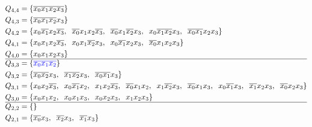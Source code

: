 \documentclass[a4paper]{article}
\begin{document}
\begin{enumerate}[label=\alph*)]
\begin{enumerate}[label=\roman*)]
		\begin{align*}
			Q_{4,4} &= \{\overline{x_0 x_1 x_2 x_3}\}\\
			Q_{4,3} &= \{\overline{x_0 x_1 x_2} x_3\}\\
			Q_{4,2} &= \{x_0 \overline{x_1} x_2 \overline{x_3},\hspace{0.2cm} \overline{x_0} x_1 x_2 \overline{x_3},\hspace{0.2cm} \overline{x_0} x_1 \overline{x_2} x_3,\hspace{0.2cm} 
			x_0 \overline{x_1 x_2} x_3,\hspace{0.2cm} 
			\overline{x_0 x_1} x_2 x_3
			\}\\
			Q_{4,1} &= \{x_0 x_1 x_2 \overline{x_3},\hspace{0.2cm} x_0 x_1 \overline{x_2} x_3,\hspace{0.2cm} 
			x_0 \overline{x_1} x_2 x_3,\hspace{0.2cm} \overline{x_0} x_1 x_2 x_3
				\}\\
			Q_{4,0} &= \{x_0 x_1 x_2 x_3\}\\
			\hline
			Q_{3,3} &= \{\textcolor{blue}{\overline{x_0x_1x_2}}\}\\
			Q_{3,2} &= \{\overline{x_0x_2}x_3,\hspace{0.2cm} \overline{x_1x_2}x_3,\hspace{0.2cm}
			\overline{x_0x_1}x_3\}\\
			Q_{3,1} &= \{x_0x_2\overline{x_3},\hspace{0.2cm} x_0\overline{x_1}x_2,\hspace{0.2cm} 
			x_1x_2\overline{x_3},\hspace{0.2cm} 
			\overline{x_0}x_1x_2,\hspace{0.2cm} 
			x_1\overline{x_2}x_3,\hspace{0.2cm} 
			\overline{x_0}x_1x_3,\hspace{0.2cm} 
			x_0\overline{x_1}x_3,\hspace{0.2cm} 
			\overline{x_1}x_2x_3,\hspace{0.2cm}
			\overline{x_0}x_2x_3\}\\
			Q_{3,0} &= \{x_0x_1x_2,\hspace{0.2cm} 
			x_0x_1x_3,\hspace{0.2cm}
			x_0x_2x_3,\hspace{0.2cm}
			x_1x_2x_3\}\\
			\hline
			Q_{2,2} &= \{ \}\\
			Q_{2,1} &= \{\overline{x_0}x_3,\hspace{0.2cm} \overline{x_2}x_3,\hspace{0.2cm} \overline{x_1}x_3\}\\

\end{align*}
\end{enumerate}
\end{enumerate}
\end{document}
